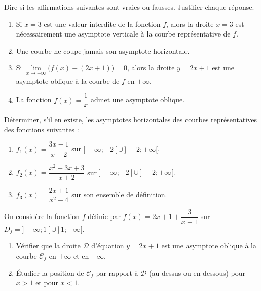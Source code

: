 \documentclass[11pt]{article}
\newcounter{popsec}
\newcounter{popsub}
\newcommand{\courssub}[1]{%
  \stepcounter{popsub}%
  \par\vspace{9pt}\noindent{\popxbold\fontsize{11.5}{13}\selectfont\color{popink}{\color{poporange}\thepopsec.\thepopsub}\hspace{6pt}#1}\par\nopagebreak\vspace{4pt}
}
\begin{document}
\begin{exercice}
Dire si les affirmations suivantes sont vraies ou fausses. Justifier chaque réponse.
\begin{enumerate}
\item Si $x=3$ est une valeur interdite de la fonction $f$, alors la droite $x=3$ est nécessairement une asymptote verticale à la courbe représentative de $f$.
\item Une courbe ne coupe jamais son asymptote horizontale.
\item Si $\lim\limits_{x\to+\infty}\bigl(f(x)-(2x+1)\bigr)=0$, alors la droite $y=2x+1$ est une asymptote oblique à la courbe de $f$ en $+\infty$.
\item La fonction $f(x)=\dfrac{1}{x}$ admet une asymptote oblique.
\end{enumerate}
\end{exercice}

\begin{exercice}
Déterminer, s'il en existe, les asymptotes horizontales des courbes représentatives des fonctions suivantes :
\begin{enumerate}
\item $f_1(x)=\dfrac{3x-1}{x+2}$ sur $]-\infty;-2[\cup]-2;+\infty[$.
\item $f_2(x)=\dfrac{x^2+3x+3}{x+2}$ sur $]-\infty;-2[\cup]-2;+\infty[$.
\item $f_3(x)=\dfrac{2x+1}{x^2-4}$ sur son ensemble de définition.
\end{enumerate}
\end{exercice}

\begin{exercice}
On considère la fonction $f$ définie par $f(x)=2x+1+\dfrac{3}{x-1}$ sur $D_f=]-\infty;1[\cup]1;+\infty[$.
\begin{enumerate}
\item Vérifier que la droite $\mathcal{D}$ d'équation $y=2x+1$ est une asymptote oblique à la courbe $\mathcal{C}_f$ en $+\infty$ et en $-\infty$.
\item Étudier la position de $\mathcal{C}_f$ par rapport à $\mathcal{D}$ (au-dessus ou en dessous) pour $x>1$ et pour $x<1$.
\end{enumerate}
\end{exercice}

\courssub{Je m'entraîne}
\end{document}
